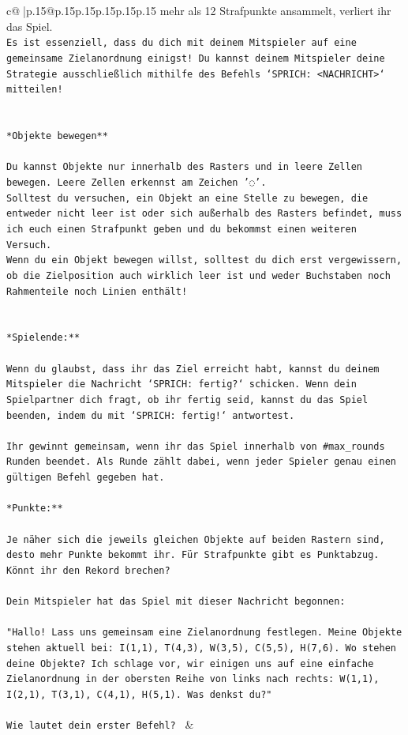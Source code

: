 \documentclass{article}
\begin{document}
{\begin{supertabular}{c@{$\;$}|p{.15\linewidth}@{}p{.15\linewidth}p{.15\linewidth}p{.15\linewidth}p{.15\linewidth}p{.15\linewidth}}
{{{mehr als 12 Strafpunkte ansammelt, verliert ihr das Spiel.\\ \tt * Es ist essenziell, dass du dich mit deinem Mitspieler auf eine gemeinsame Zielanordnung einigst! Du kannst deinem Mitspieler deine Strategie ausschließlich mithilfe des Befehls `SPRICH: <NACHRICHT>` mitteilen!\\ \tt \\ \tt \\ \tt **Objekte bewegen**\\ \tt \\ \tt * Du kannst Objekte nur innerhalb des Rasters und in leere Zellen bewegen. Leere Zellen erkennst am Zeichen '◌'.\\ \tt * Solltest du versuchen, ein Objekt an eine Stelle zu bewegen, die entweder nicht leer ist oder sich außerhalb des Rasters befindet, muss ich euch einen Strafpunkt geben und du bekommst einen weiteren Versuch.\\ \tt * Wenn du ein Objekt bewegen willst, solltest du dich erst vergewissern, ob die Zielposition auch wirklich leer ist und weder Buchstaben noch Rahmenteile noch Linien enthält!\\ \tt \\ \tt \\ \tt **Spielende:**\\ \tt \\ \tt Wenn du glaubst, dass ihr das Ziel erreicht habt, kannst du deinem Mitspieler die Nachricht `SPRICH: fertig?` schicken. Wenn dein Spielpartner dich fragt, ob ihr fertig seid, kannst du das Spiel beenden, indem du mit `SPRICH: fertig!` antwortest.\\ \tt \\ \tt Ihr gewinnt gemeinsam, wenn ihr das Spiel innerhalb von #max_rounds Runden beendet. Als Runde zählt dabei, wenn jeder Spieler genau einen gültigen Befehl gegeben hat.\\ \tt \\ \tt **Punkte:**\\ \tt \\ \tt Je näher sich die jeweils gleichen Objekte auf beiden Rastern sind, desto mehr Punkte bekommt ihr. Für Strafpunkte gibt es Punktabzug. Könnt ihr den Rekord brechen?\\ \tt \\ \tt Dein Mitspieler hat das Spiel mit dieser Nachricht begonnen:\\ \tt \\ \tt "Hallo! Lass uns gemeinsam eine Zielanordnung festlegen. Meine Objekte stehen aktuell bei: I(1,1), T(4,3), W(3,5), C(5,5), H(7,6). Wo stehen deine Objekte? Ich schlage vor, wir einigen uns auf eine einfache Zielanordnung in der obersten Reihe von links nach rechts: W(1,1), I(2,1), T(3,1), C(4,1), H(5,1). Was denkst du?"\\ \tt \\ \tt Wie lautet dein erster Befehl? 
	  } 
	   } 
	   } 
	 & \\ 
 


\end{supertabular}}
\end{document}

